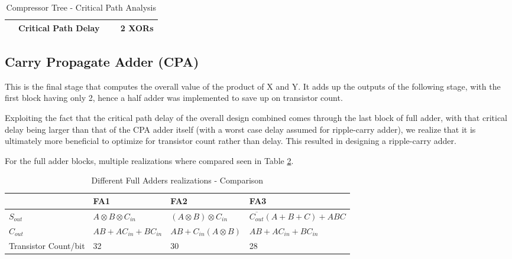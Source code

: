 \documentclass[journal]{IEEEtran}
\begin{document}
\begin{table}[!h]
\renewcommand{\arraystretch}{1.5}
\caption{Compressor Tree - Critical Path Analysis}
\label{tab:t4}
\centering
\begin{tabular}{|c|c|}
\hline
~~Critical Path Delay ~~ & 2 XORs\\
\hline
\end{tabular}
\end{table}

\vspace{-10pt}




\subsection{Carry Propagate Adder (CPA)}

This is the final stage that computes the overall value of the product of X and Y. It adds up the outputs of the following stage, with the first block having only 2, hence a half adder was implemented to save up on transistor count.

Exploiting the fact that the critical path delay of the overall design combined comes through the last block of full adder, with that critical delay being larger than that of the CPA adder itself (with a worst case delay assumed for ripple-carry adder), we realize that it is ultimately more beneficial to optimize for transistor count rather than delay. This resulted in designing a ripple-carry adder.

For the full adder blocks, multiple realizations where compared seen in Table 
\ref{tab:t5}.


\begin{table}[!h]
\renewcommand{\arraystretch}{1.2}
\caption{Different Full Adders realizations - Comparison}
\label{tab:t5}
\centering
\begin{tabular}{| p{1cm} | p{2cm} | p{2cm} | p{2cm} |}
\hline
~~ & \textbf{FA1} & \textbf{FA2} & \textbf{FA3}\\\hline
$S_{out}$ & $A\otimes B\otimes C_{in}$ & $(A\otimes B) \otimes C_{in} $ & 
$\overline{C_{out}}(A+B+C)+ ABC$\\\hline
$C_{out}$ & $AB + A C_{in} + B C_{in}$ & $AB + C_{in}  (A\otimes B) $ & $AB + A C_{in} + B C_{in}$\\\hline
Transistor Count/bit & 32 & 30 & 28\\\hline
\end{tabular}
\end{table}
\end{document}
